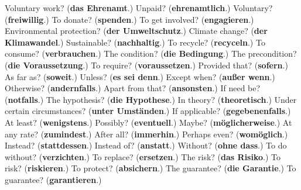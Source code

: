 \begin{tcolorbox}[breakable,colback=teal!4,colframe=teal!35!black,title={Before you move on}]
Voluntary work? (\textbf{das Ehrenamt}.) Unpaid? (\textbf{ehrenamtlich}.) Voluntary? (\textbf{freiwillig}.) To donate? (\textbf{spenden}.) To get involved? (\textbf{engagieren}.) Environmental protection? (\textbf{der Umweltschutz}.) Climate change? (\textbf{der Klimawandel}.) Sustainable? (\textbf{nachhaltig}.) To recycle? (\textbf{recyceln}.) To consume? (\textbf{verbrauchen}.) The condition? (\textbf{die Bedingung}.) The precondition? (\textbf{die Voraussetzung}.) To require? (\textbf{voraussetzen}.) Provided that? (\textbf{sofern}.) As far as? (\textbf{soweit}.) Unless? (\textbf{es sei denn}.) Except when? (\textbf{außer wenn}.) Otherwise? (\textbf{andernfalls}.) Apart from that? (\textbf{ansonsten}.) If need be? (\textbf{notfalls}.) The hypothesis? (\textbf{die Hypothese}.) In theory? (\textbf{theoretisch}.) Under certain circumstances? (\textbf{unter Umständen}.) If applicable? (\textbf{gegebenenfalls}.) At least? (\textbf{wenigstens}.) Possibly? (\textbf{eventuell}.) Maybe? (\textbf{möglicherweise}.) At any rate? (\textbf{zumindest}.) After all? (\textbf{immerhin}.) Perhaps even? (\textbf{womöglich}.) Instead? (\textbf{stattdessen}.) Instead of? (\textbf{anstatt}.) Without? (\textbf{ohne dass}.) To do without? (\textbf{verzichten}.) To replace? (\textbf{ersetzen}.) The risk? (\textbf{das Risiko}.) To risk? (\textbf{riskieren}.) To protect? (\textbf{absichern}.) The guarantee? (\textbf{die Garantie}.) To guarantee? (\textbf{garantieren}.)
\end{tcolorbox}
